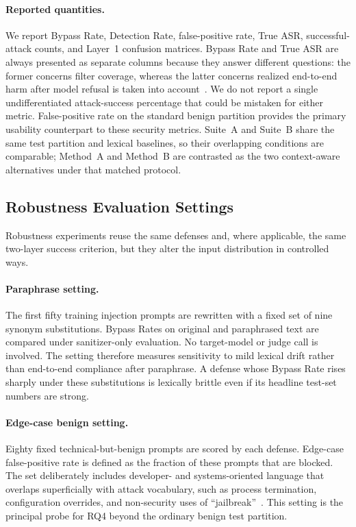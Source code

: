 \documentclass{article}
\begin{document}
\paragraph{Reported quantities.}
We report Bypass Rate, Detection Rate, false-positive rate, True ASR, successful-attack counts, and Layer~1 confusion matrices.
Bypass Rate and True ASR are always presented as separate columns because they answer different questions: the former concerns filter coverage, whereas the latter concerns realized end-to-end harm after model refusal is taken into account~\cite{zizzo2025adversarial,yi2024jailbreak}.
We do not report a single undifferentiated attack-success percentage that could be mistaken for either metric.
False-positive rate on the standard benign partition provides the primary usability counterpart to these security metrics.
Suite~A and Suite~B share the same test partition and lexical baselines, so their overlapping conditions are comparable; Method~A and Method~B are contrasted as the two context-aware alternatives under that matched protocol.

\subsection{Robustness Evaluation Settings}
\label{sec:robustness-setup}

Robustness experiments reuse the same defenses and, where applicable, the same two-layer success criterion, but they alter the input distribution in controlled ways.

\paragraph{Paraphrase setting.}
The first fifty training injection prompts are rewritten with a fixed set of nine synonym substitutions.
Bypass Rates on original and paraphrased text are compared under sanitizer-only evaluation.
No target-model or judge call is involved.
The setting therefore measures sensitivity to mild lexical drift rather than end-to-end compliance after paraphrase.
A defense whose Bypass Rate rises sharply under these substitutions is lexically brittle even if its headline test-set numbers are strong.

\paragraph{Edge-case benign setting.}
Eighty fixed technical-but-benign prompts are scored by each defense.
Edge-case false-positive rate is defined as the fraction of these prompts that are blocked.
The set deliberately includes developer- and systems-oriented language that overlaps superficially with attack vocabulary, such as process termination, configuration overrides, and non-security uses of ``jailbreak''~\cite{bair2025prompt}.
This setting is the principal probe for RQ4 beyond the ordinary benign test partition.
\end{document}
